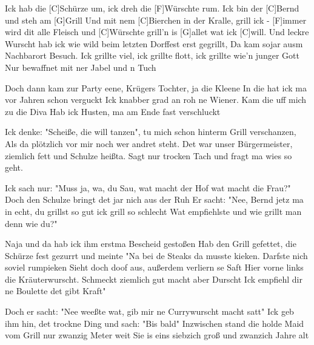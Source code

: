 

\begin{guitar}
	Ick hab die [C]Schürze um, ick dreh die [F]Würschte rum.
	Ick bin der [C]Bernd und steh am [G]Grill
	Und mit nem [C]Bierchen in der Kralle, grill ick - [F]immer wird dit alle
	Fleisch und [C]Würschte grill'n is [G]allet wat ick [C]will.
	\footnotesize	
	Und leckre Wurscht hab ick wie wild beim letzten Dorffest erst gegrillt,
	Da kam sojar ausm Nachbarort Besuch.
	Ick grillte viel, ick grillte flott, ick grillte wie'n junger Gott
	Nur bewaffnet mit ner Jabel und n Tuch
	
	Doch dann kam zur Party eene, Krügers Tochter, ja die Kleene
	In die hat ick ma vor Jahren schon verguckt
	Ick knabber grad an roh ne Wiener. Kam die uff mich zu die Diva
	Hab ick Husten, ma am Ende fast verschluckt
	
	 
	
	Ick denke: "Scheiße, die will tanzen", tu mich schon hinterm Grill verschanzen,
	Als da plötzlich vor mir noch wer andret steht.
	Det war unser Bürgermeister, ziemlich fett und Schulze heißta.
	Sagt nur trocken Tach und fragt ma wies so geht.
	
	Ick sach nur: "Muss ja, wa, du Sau, wat macht der Hof wat macht die Frau?"
	Doch den Schulze bringt det jar nich aus der Ruh
	Er sacht: "Nee, Bernd jetz ma in echt, du grillst so gut ick grill so schlecht
	Wat empfiehlste und wie grillt man denn wie du?"
	
	 
	
	Naja und da hab ick ihm erstma Bescheid gestoßen
	Hab den Grill gefettet, die Schürze fest gezurrt und meinte
	"Na bei de Steaks da musste kieken. Darfste nich soviel rumpieken
	Sieht doch doof aus, außerdem verliern se Saft
	Hier vorne links die Kräuterwurscht. Schmeckt ziemlich gut macht aber Durscht
	Ick empfiehl dir ne Boulette det gibt Kraft"
	
	Doch er sacht: "Nee weeßte wat, gib mir ne Currywurscht macht satt"
	Ick geb ihm hin, det trockne Ding und sach: "Bis bald"
	Inzwischen stand die holde Maid vom Grill nur zwanzig Meter weit
	Sie is eins siebzich groß und zwanzich Jahre alt
	

\end{guitar}
